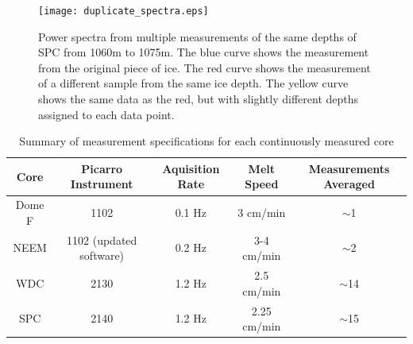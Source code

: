 \documentclass[draft, jgrga]{AGUTeX}
\begin{document}
\begin{figure}
	\texttt{[image: duplicate\_spectra.eps]}
	\caption{Power spectra from multiple measurements of the same depths of SPC from 1060m to 1075m. The blue curve shows the measurement from the original piece of ice. The red curve shows the measurement of a different sample from the same ice depth. The yellow curve shows the same data as the red, but with slightly different depths assigned to each data point.} \label{duplicate_spectra}
\end{figure}

\begin{table}
\caption{Summary of measurement specifications for each continuously measured core}
\label{tab:picarro_table}
\centering
\begin{tabular}{|c | c c c c|}
\hline
Core  & Picarro Instrument & Aquisition Rate & Melt Speed & Measurements Averaged \\
\hline
Dome F  & 1102 & 0.1 Hz & 3 cm/min & $\sim$1   \\
NEEM & 1102 (updated software) & 0.2 Hz & 3-4 cm/min & $\sim$2   \\
WDC & 2130 & 1.2 Hz & 2.5 cm/min & $\sim$14   \\
SPC & 2140 & 1.2 Hz & 2.25 cm/min & $\sim$15   \\
\hline
\end{tabular}
\end{table}
\end{document}
